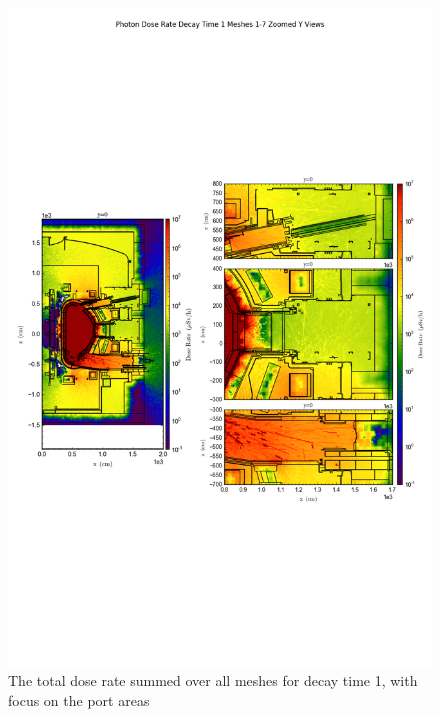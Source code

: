 \documentclass[12pt]{article}
\begin{document}
\begin{figure}[ht!]
\centering
\includegraphics[trim={0cm 9cm 0cm 10cm},clip,scale=0.75]{../plots/final_model/Photon_Dose_Rate_Decay_Time_1_Meshes_1-7_Zoomed_Y_Views.png}
\caption{The total dose rate summed over all meshes for decay time 1, with focus on the port areas}
\label{fig:photons_dc1_no4bc_total_zoomed}
\end{figure}
\end{document}
